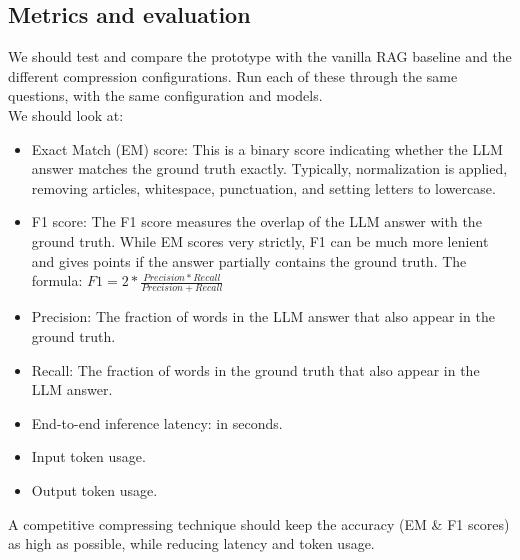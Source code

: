\documentclass[pdflatex,sn-mathphys-num,oneside]{sn-jnl}%
\theoremstyle{thmstyleone}%
\theoremstyle{thmstyletwo}%
\theoremstyle{thmstylethree}%
\begin{document}
\subsection{Metrics and evaluation}
We should test and compare the prototype with the vanilla RAG baseline and the different compression configurations. 
Run each of these through the same questions, with the same configuration and models. 
\\We should look at:
\begin{itemize}
    \item Exact Match (EM) score: This is a binary score indicating whether the LLM answer matches the ground truth exactly. 
    Typically, normalization is applied, removing articles, whitespace, punctuation, and setting letters to lowercase.
    \item F1 score: The F1 score measures the overlap of the LLM answer with the ground truth. While EM scores very strictly, F1 can be much more lenient
    and gives points if the answer partially contains the ground truth. The formula: \( F1 = 2 * \frac{Precision * Recall}{Precision + Recall}\)
    \item Precision: The fraction of words in the LLM answer that also appear in the ground truth.
    \item Recall: The fraction of words in the ground truth that also appear in the LLM answer. 
    \item End-to-end inference latency: in seconds.
    \item Input token usage.
    \item Output token usage.
\end{itemize}

A competitive compressing technique should keep the accuracy (EM \& F1 scores) as high as possible, while reducing latency and token usage.
\end{document}

